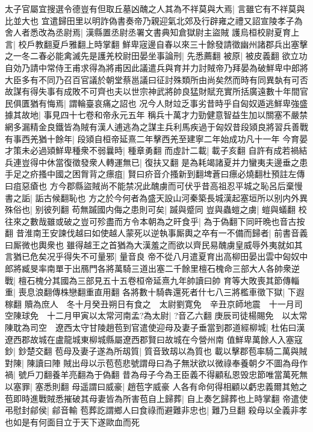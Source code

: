 太子官屬宜搜選令德豈有但取丘墓凶醜之人其為不祥莫與大焉|{
	言雖它有不祥莫與比並大也}
宜遣歸田里以明詐偽書奏帝乃親迎氣北郊及行辟雍之禮又詔宣陵孝子為舍人者悉改為丞尉焉|{
	漢縣置丞尉丞署文書典知倉獄尉主盜賊}
護烏桓校尉夏育上言|{
	校戶教翻夏戶雅翻上時掌翻}
鮮卑宼邊自春以來三十餘發請徵幽州諸郡兵出塞擊之一冬二春必能禽滅先是護羌校尉田晏坐事論刑|{
	先悉薦翻}
被原|{
	被皮義翻}
欲立功自効乃請中常侍王甫求得為將甫因此議遣兵與育并力討賊帝乃拜晏為破鮮卑中郎將大臣多有不同乃召百官議於朝堂蔡邕議曰征討殊類所由尚矣然而時有同異埶有可否故謀有得失事有成敗不可齊也夫以世宗神武將帥良猛財賦充實所括廣遠數十年間官民俱匱猶有悔焉|{
	謂輪臺哀痛之詔也}
况今人財竝乏事劣昔時乎自匈奴遁逃鮮卑強盛據其故地|{
	事見四十七卷和帝永元五年}
稱兵十萬才力勁健意智益生加以關塞不嚴禁網多漏精金良鐵皆為賊有漢人逋逃為之謀主兵利馬疾過于匈奴昔段熲良將習兵善戰有事西羌猶十餘年|{
	段熲自桓帝延熹二年擊西羌至建寧二年始成功凡十一年}
今育晏才策未必過熲鮮卑種衆不弱曩時|{
	種章勇翻}
而虛計二載|{
	載子亥翻}
自許有成若禍結兵連豈得中休當復徵發衆人轉運無已|{
	復扶又翻}
是為耗竭諸夏并力蠻夷夫邊垂之患手足之疥搔中國之困胷背之瘭疽|{
	賢曰疥音介搔新到翻埤蒼曰瘭必燒翻杜預註左傳曰疽惡瘡也}
方今郡縣盜賊尚不能禁况此醜虜而可伏乎昔高祖忍平城之恥呂后棄慢書之詬|{
	詬古候翻恥也}
方之於今何者為盛天設山河秦築長城漢起塞垣所以别内外異殊俗也|{
	别彼列翻}
苟無䠞國内侮之患則可矣|{
	䠞與蹙同}
豈與蟲螘之虜|{
	螘與蟻翻}
校往來之數哉雖或破之豈可殄盡而方令本朝為之旰食乎|{
	為于偽翻下同旰晩也音古按翻}
昔淮南王安諫伐越曰如使越人蒙死以逆執事厮輿之卒有一不備而歸者|{
	前書音義曰厮微也輿衆也}
雖得越王之首猶為大漢羞之而欲以齊民易醜虜皇威辱外夷就如其言猶已危矣况乎得失不可量邪|{
	量音良}
帝不從八月遣夏育出高柳田晏出雲中匈奴中郎將臧旻率南單于出鴈門各將萬騎三道出塞二千餘里檀石槐命三部大人各帥衆逆戰|{
	檀石槐分其國為三部見五十五卷桓帝延熹九年帥讀曰帥}
育等大敗喪其節傳輜重|{
	喪息浪翻傳株戀翻重直用翻}
各將數十騎犇還死者什七八三將檻車徵下獄|{
	下遐稼翻}
贖為庶人　冬十月癸丑朔日有食之　太尉劉寛免　辛丑京師地震　十一月司空陳球免　十二月甲寅以太常河南孟?為太尉|{
	?音乙六翻}
庚辰司徒楊賜免　以太常陳耽為司空　遼西太守甘陵趙苞到官遣使迎母及妻子垂當到郡道經柳城|{
	杜佑曰漢遼西郡故城在盧龍城東柳城縣屬遼西郡賢曰故城在今營州南}
值鮮卑萬餘人入塞寇鈔|{
	鈔楚交翻}
苞母及妻子遂為所刼質|{
	質音致刼以為質也}
載以擊郡苞率騎二萬與賊對陳|{
	陳讀曰陣}
賊出母以示苞苞悲號謂母曰為子無狀欲以微祿奉養朝夕不圖為母作禍|{
	號戶刀翻養羊亮翻為于偽翻}
昔為母子今為王臣義不得顧私恩毁忠節唯當萬死無以塞罪|{
	塞悉則翻}
母遥謂曰威豪|{
	趙苞字威豪}
人各有命何得相顧以虧忠義爾其勉之苞即時進戰賊悉摧破其母妻皆為所害苞自上歸葬|{
	自上奏乞歸葬也上時掌翻}
帝遣使弔慰封鄃侯|{
	鄃音輸}
苞葬訖謂鄉人曰食祿而避難非忠也|{
	難乃旦翻}
殺母以全義非孝也如是有何面目立于天下遂歐血而死

